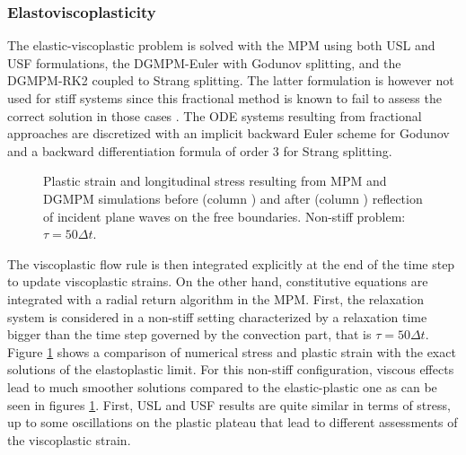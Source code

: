 \subsubsection{Elastoviscoplasticity}
The elastic-viscoplastic problem is solved with the MPM using both USL and USF formulations, the DGMPM-Euler with Godunov splitting, and the DGMPM-RK2 coupled to Strang splitting.
The latter formulation is however not used for stiff systems since this fractional method is known to fail to assess the correct solution in those cases \cite{Thomas_EVP,Leveque_stiff}.
The ODE systems resulting from fractional approaches are discretized with an implicit backward Euler scheme for Godunov and a backward differentiation formula of order 3 for Strang splitting.
\begin{figure}[h!]
  \centering
  { \label{subfig:evp_nonstiff1}}
  { \label{subfig:evp_nonstiff3}}
  {}
  \caption{Plastic strain and longitudinal stress resulting from MPM and DGMPM simulations before (column ) and after (column ) reflection of incident plane waves on the free boundaries. Non-stiff problem: $\tau=50\Delta t$.}
  \label{fig:nonstiff_elastoviscoplastic_RP}
\end{figure}
The viscoplastic flow rule is then integrated explicitly at the end of the time step to update viscoplastic strains.
On the other hand, constitutive equations are integrated with a radial return algorithm \cite{Simo} in the MPM.
First, the relaxation system is considered in a non-stiff setting characterized by a relaxation time bigger than the time step governed by the convection part, that is $\tau=50\Delta t$.
Figure \ref{fig:nonstiff_elastoviscoplastic_RP} shows a comparison of numerical stress and plastic strain with the exact solutions of the elastoplastic limit.
For this non-stiff configuration, viscous effects lead to much smoother solutions compared to the elastic-plastic one as can be seen in figures \ref{fig:nonstiff_elastoviscoplastic_RP}.
First, USL and USF results are quite similar in terms of stress, up to some oscillations on the plastic plateau that lead to different assessments of the viscoplastic strain. 
